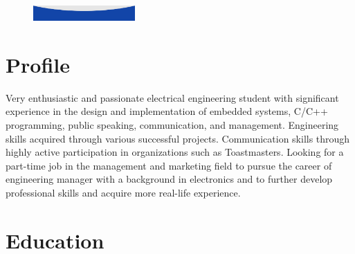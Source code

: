 \documentclass[lighthipster]{simplehipstercv}
\begin{document}
\begin{paracol}{2}
{\begin{minipage}[t][0.92\textheight]{0.288\textwidth}
\begin{tabular}{@{}l l}
	\end{tabular}
\end{minipage}

\begin{figure}[b]
	\center
	\includegraphics[width=0.347\textwidth]{figures/bottom.png}
\end{figure}

}
\switchcolumn

\normalsize

\begin{minipage}[t]{0.60\textwidth}

	\normalsize
	\vspace{22px}

	\section*{Profile}
	\vspace{2mm}
	\phantom{aa} 
	Very enthusiastic and passionate electrical engineering student with significant 
	experience in the design and implementation of embedded systems, C/C++ programming,
	public speaking, communication, and management. Engineering skills acquired through 
	various successful projects. Communication skills through highly active participation
	in organizations such as Toastmasters. Looking for a part-time job in the 
	management and marketing field to pursue the career of engineering manager with a 
	background in electronics and to further develop professional skills and acquire more
	real-life experience.

	\bigskip

	\section*{Education}
	\begin{tabular}{@{}l c @{}r}


\end{tabular}
\end{minipage}
\end{paracol}
\end{document}
